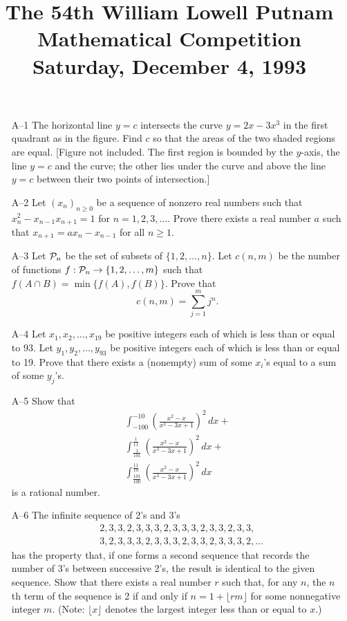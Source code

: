 \documentclass[amssymb,twocolumn,pra,10pt,aps]{revtex4-1}
\begin{document}
\title{The 54th William Lowell Putnam Mathematical Competition \\
    Saturday, December 4, 1993}
\maketitle

\begin{itemize}

\item[A--1] The horizontal line $y=c$ intersects the curve $y = 2x - 3x^3$
in the first quadrant as in the figure. Find $c$ so that the areas of the
two shaded regions are equal. [Figure not included. The first region is
bounded by the $y$-axis, the line $y=c$ and the curve; the other lies
under the curve and above the line $y=c$ between their two points of
intersection.]

\item[A--2] Let $(x_n)_{n \geq 0}$ be a sequence of nonzero real numbers
such that $x_n^2 - x_{n-1}x_{n+1} = 1$ for $n=1,2,3,\dots$. Prove there
exists a real number $a$ such that $x_{n+1} = ax_n - x_{n-1}$ for all $n
\geq 1$.

\item[A--3] Let ${\cal P}_n$ be the set of subsets of $\{1, 2, \dots,
n\}$. Let $c(n, m)$ be the number of functions $f: {\cal P}_n \to \{1, 2,
\dots, m\}$ such that $f(A \cap B) = \min\{f(A), f(B)\}$. Prove that
\[
c(n, m) = \sum_{j=1}^m j^n.
\]

\item[A--4] Let $x_1, x_2, \dots, x_{19}$ be positive integers each of
which is less than or equal to 93. Let $y_1, y_2, \dots, y_{93}$ be
positive integers each of which is less than or equal to 19. Prove that
there exists a (nonempty) sum of some $x_i$'s equal to a sum of some $y_j$'s.

\item[A--5] Show that
\begin{gather*}
\int_{-100}^{-10} \left( \frac{x^2 - x}{x^3 - 3x + 1} \right)^2\,dx + \\
\int_{\frac{1}{101}}^{\frac{1}{11}} \left( \frac{x^2 - x}{x^3 - 3x + 1} \right)^2\,dx + \\
\int_{\frac{101}{100}}^{\frac{11}{10}} \left( \frac{x^2 - x}{x^3 - 3x + 1} \right)^2\,dx
\end{gather*}
is a rational number.

\item[A--6]
The infinite sequence of 2's and 3's
\begin{align*}
&2,3,3,2,3,3,3,2,3,3,3,2,3,3,2,3,3, \\
&3,2,3,3,3,2,3,3,3,2,3,3,2,3,3,3,2,\dots
\end{align*}
has the property that, if one forms a second sequence that records the
number of 3's between successive 2's, the result is identical to the
given sequence. Show that there exists a real number $r$ such that, for
any $n$, the $n$th term of the sequence is 2 if and only if $n = 1 +
\lfloor rm \rfloor$ for some nonnegative integer $m$. (Note: $\lfloor x
\rfloor$ denotes the largest integer less than or equal to $x$.)


\end{itemize}
\end{document}

